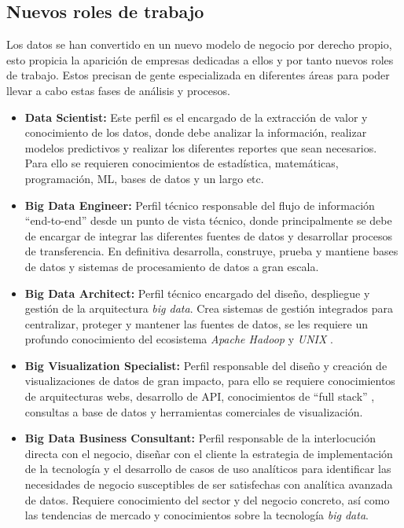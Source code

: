 \subsection{Nuevos roles de trabajo}
Los datos se han convertido en un nuevo modelo de negocio por derecho propio, esto propicia la aparición de empresas dedicadas a ellos y por tanto nuevos roles de trabajo. Estos precisan de gente especializada en diferentes áreas para poder llevar a cabo estas fases de análisis y procesos.

\begin{itemize}
	\item \textbf{Data Scientist:} Este perfil es el encargado de la extracción de valor y conocimiento de los datos, donde debe analizar la información, realizar modelos predictivos y realizar los diferentes reportes que sean necesarios. Para ello se requieren conocimientos de estadística, matemáticas, programación, \gls{ML}, bases de datos y un largo etc.
	
	\item \textbf{Big Data Engineer:} Perfil técnico responsable del flujo de información ``end-to-end'' desde un punto de vista técnico, donde principalmente se debe de encargar de integrar las diferentes fuentes de datos y desarrollar procesos de transferencia. En definitiva desarrolla, construye, prueba y mantiene bases de datos y sistemas de procesamiento de datos a gran escala.
	
	\item \textbf{Big Data Architect:} Perfil técnico encargado del diseño, despliegue y gestión de la arquitectura \textit{big data}. Crea sistemas de gestión integrados para centralizar, proteger y mantener las fuentes de datos, se les requiere un profundo conocimiento del ecosistema \textit{Apache Hadoop} y \textit{UNIX} \cite{unix}.
	
	\item \textbf{Big Visualization Specialist:} Perfil responsable del diseño y creación de visualizaciones de datos de gran impacto, para ello se requiere conocimientos de arquitecturas webs, desarrollo de \gls{API}, conocimientos de ``full stack'' \cite{fullStack}, consultas a base de datos y herramientas comerciales de visualización.
	
	\item \textbf{Big Data Business Consultant:} Perfil responsable de la interlocución directa con el negocio, diseñar con el cliente la estrategia de implementación de la tecnología y el desarrollo de casos de uso analíticos para identificar las necesidades de negocio susceptibles de ser satisfechas con analítica avanzada de datos. Requiere conocimiento del sector y del negocio concreto, así como las tendencias de mercado y conocimientos sobre la tecnología \textit{big data}.	
	
\end{itemize}


